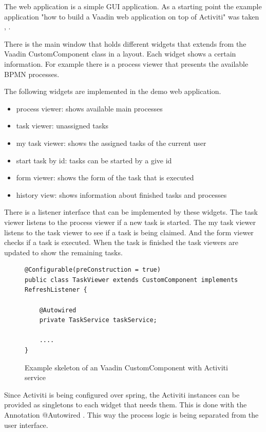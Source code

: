 \documentclass[paper=a4,twoside=false,BCOR=0mm,DIV=calc,fontsize=12pt]{scrartcl}
\begin{document}
The web application is a simple GUI application. As a starting point the example application "how to build a Vaadin web application on top of Activiti" was taken \cite{Vaadinactivitwebapp}, \cite{Vaadinactivitwebapp2}.

There is the main window that holds different widgets that extends from the Vaadin CustomComponent class in a layout. Each widget shows a certain
information. For example there is a process viewer that presents the available BPMN processes. 

The following widgets are implemented in the demo web application.

\begin{itemize}
 \item process viewer: shows available main processes
 \item task viewer: unassigned tasks
 \item my task viewer: shows the assigned tasks of the current user
 \item start task by id: tasks can be started by a give id
 \item form viewer: shows the form of the task that is executed
 \item history view: shows information about finished tasks and processes
\end{itemize}

There is a listener interface that can be implemented by these widgets. The task viewer listens to the process viewer if a new task is started. The
my task viewer listens to the task viewer to see if a task is being claimed. And the form viewer checks if a task is executed. When the task is
finished the task viewers are updated to show the remaining tasks.

\begin{figure}
    \begin{center}
\begin{verbatim}
@Configurable(preConstruction = true)
public class TaskViewer extends CustomComponent implements RefreshListener {

    @Autowired
    private TaskService taskService;

    ....
}
\end{verbatim}
  \caption{Example skeleton of an Vaadin CustomComponent with Activiti service}
   \end{center}
  \label{examplecodecomponent}
\end{figure} 

Since Activiti is being configured over spring, the Activiti instances can be provided as singletons to each widget that needs them. This is done with the Annotation @Autowired \cite{autowire}. This way the
process logic is being separated from the user interface.
\end{document}
